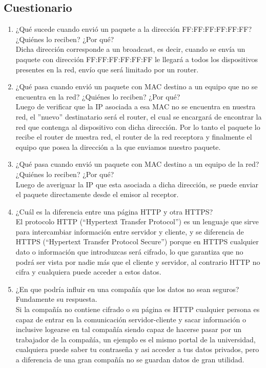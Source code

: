 \documentclass{article}
\begin{document}
\subsection{Cuestionario \vspace{0.3cm}}
\begin{enumerate}

\item¿Qué sucede cuando envió un paquete a la dirección FF:FF:FF:FF:FF:FF? ¿Quiénes lo reciben? ¿Por qué?\\
\newline Dicha dirección corresponde a un broadcast, es decir, cuando se envía un paquete con dirección FF:FF:FF:FF:FF:FF le llegará a todos los dispositivos presentes en la red, envío que será limitado por un router.
\item¿Qué pasa cuando envió un paquete con MAC destino a un equipo que no se encuentra en la red? ¿Quiénes lo reciben? ¿Por qué?\\
\newline Luego de verificar que la IP asociada a esa MAC no se encuentra en nuestra red, el ''nuevo'' destinatario será el router, el cual se encargará de encontrar la red que contenga al dispositivo con dicha dirección. Por lo tanto el paquete lo recibe el router de nuestra red, el router de la red receptora y finalmente el equipo que posea la dirección a la que enviamos nuestro paquete.

\item¿Qué pasa cuando envió un paquete con MAC destino a un equipo de la red? ¿Quiénes lo reciben? ¿Por qué?\\
\newline Luego de averiguar la IP que esta asociada a dicha dirección, se puede enviar el paquete directamente desde el emisor al receptor.

\item¿Cuál es la diferencia entre una página HTTP y otra HTTPS?\\
\newline El protocolo HTTP (“Hypertext Transfer Protocol”) es un lenguaje que sirve para intercambiar información entre servidor y cliente, y se diferencia de HTTPS (“Hypertext Transfer Protocol Secure”) porque en HTTPS cualquier dato o información que introduzcas será cifrado, lo que garantiza que no podrá ser vista por nadie más que el cliente y servidor, al contrario HTTP no cifra y cualquiera puede acceder a estos datos.

\item¿En que podría influir en una compañía que los datos no sean seguros? Fundamente su respuesta.\\
\newline Si la compañía no contiene cifrado o su página es HTTP cualquier persona es capaz de entrar en la comunicación servidor-cliente y sacar información o inclusive logearse en tal compañía siendo capaz de hacerse pasar por un trabajador de la compañía, un ejemplo es el mismo portal de la universidad, cualquiera puede saber tu contraseña y asi acceder a tus datos privados, pero a diferencia de una gran compañía no se guardan datos de gran utilidad.

\end{enumerate}
\newpage
\end{document}
